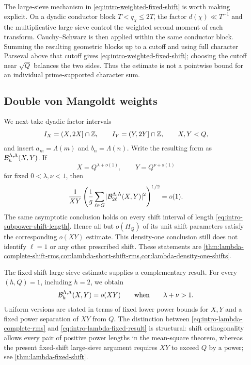 The large-sieve mechanism in \eqref{eq:intro-weighted-fixed-shift} is worth
making explicit.  On a dyadic conductor block $T<q_\chi\le2T$, the factor
$d(\chi)\ll T^{-1}$ and the multiplicative large sieve control the weighted
second moment of each transform.  Cauchy--Schwarz is then applied within the
same conductor block.  Summing the resulting geometric blocks up to a
cutoff and using full character Parseval above that cutoff gives
\eqref{eq:intro-weighted-fixed-shift}; choosing the cutoff near $\sqrt Q$
balances the two sides.  Thus the estimate is not a pointwise bound for an
individual prime-supported character sum.

\subsection{Double von Mangoldt weights}

We next take dyadic factor intervals
\begin{equation}\label{eq:intro-dyadic-prime-boxes}
 I_X=(X,2X]\cap\mathbb Z,
 \qquad
 I_Y=(Y,2Y]\cap\mathbb Z,
 \qquad X,Y<Q,
\end{equation}
and insert $a_m=\Lambda(m)$ and $b_n=\Lambda(n)$.  Write the resulting form
as $\mathcal B_h^{\Lambda,\Lambda}(X,Y)$.  If
\begin{equation}\label{eq:intro-power-sized-factors}
 X=Q^{\lambda+o(1)},
 \qquad
 Y=Q^{\nu+o(1)}
\end{equation}
for fixed $0<\lambda,\nu<1$, then
\begin{equation}\label{eq:intro-lambda-complete-rms}
 \frac1{XY}
 \left(
  \frac1g\sum_{\ell\in G}
  |\mathcal B_{2\ell}^{\Lambda,\Lambda}(X,Y)|^2
 \right)^{1/2}
 =o(1).
\end{equation}
The same asymptotic conclusion holds on every shift interval of length
\eqref{eq:intro-subpower-shift-length}.  Hence all but $o(H_Q)$ of its unit
shift parameters satisfy the corresponding $o(XY)$ estimate.  This
density-one conclusion still does not identify $\ell=1$ or any other
prescribed shift.  These statements are
\cref{thm:lambda-complete-shift-rms,cor:lambda-short-shift-rms,cor:lambda-density-one-shifts}.

The fixed-shift large-sieve estimate supplies a complementary result.  For
every $(h,Q)=1$, including $h=2$, we obtain
\begin{equation}\label{eq:intro-lambda-fixed-result}
 \mathcal B_h^{\Lambda,\Lambda}(X,Y)=o(XY)
 \qquad\text{when}\qquad \lambda+\nu>1.
\end{equation}
Uniform versions are stated in terms of fixed lower power bounds for $X,Y$
and a fixed power separation of $XY$ from $Q$.  The distinction between
\eqref{eq:intro-lambda-complete-rms} and
\eqref{eq:intro-lambda-fixed-result} is structural: shift orthogonality
allows every pair of positive power lengths in the mean-square theorem,
whereas the present fixed-shift large-sieve argument requires $XY$ to exceed
$Q$ by a power; see \cref{thm:lambda-fixed-shift}.

